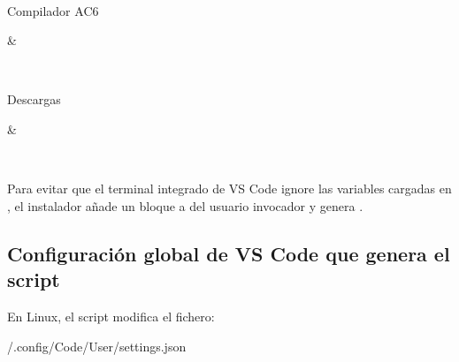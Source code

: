 \documentclass[letterpaper,10pt,english]{sphinxmanual}
\begin{document}
\begin{savenotes}
\begin{tabular}[t]{}
\begin{varwidth}[t]{}
\sphinxAtStartPar
{}
\sphinxbeforeendvarwidth
\end{varwidth}%
\\
\sphinxhline\begin{varwidth}[t]{}
\sphinxAtStartPar
Compilador AC6
\sphinxbeforeendvarwidth
\end{varwidth}%
&\begin{varwidth}[t]{}
\sphinxAtStartPar
{}
\sphinxbeforeendvarwidth
\end{varwidth}%
\\
\sphinxhline\begin{varwidth}[t]{}
\sphinxAtStartPar
Descargas
\sphinxbeforeendvarwidth
\end{varwidth}%
&\begin{varwidth}[t]{}
\sphinxAtStartPar
{}
\sphinxbeforeendvarwidth
\end{varwidth}%
\\
\sphinxbottomrule
\end{tabular}
\sphinxtableafterendhook\par
\sphinxattableend\end{savenotes}

\sphinxAtStartPar
Para evitar que el terminal integrado de VS Code ignore las variables cargadas en , el instalador añade un bloque a  del usuario invocador y genera .


\subsection{Configuración global de VS Code que genera el script}
\label{\detokenize{vscode:configuracion-global-de-vs-code-que-genera-el-script}}
\sphinxAtStartPar
En Linux, el script modifica el fichero:

\begin{sphinxVerbatim}[commandchars=\\\{\}]
\PYGZti{}/.config/Code/User/settings.json
\end{sphinxVerbatim}
\end{document}
